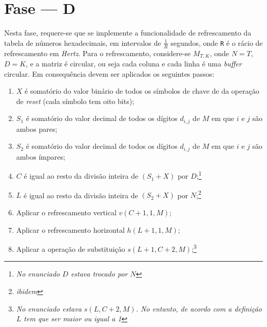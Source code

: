 \section{Fase --- D}

Nesta fase, requere-se que se implemente a funcionalidade de refrescamento da
tabela de números hexadecimais, em intervalos de $\frac{1}{R}$ segundos, onde
\texttt{R} é o rácio de refrescamento em \emph{Hertz}.  Para o refrescamento,
considere-se $M_{T,K}$, onde $N=T$, $D=K$, e a matriz é circular, ou seja cada
coluna e cada linha é uma \emph{buffer} circular. Em consequência devem ser
aplicados os seguintes passos:

\begin{enumerate}
	\item $X$ é somatório do valor binário de todos os símbolos de chave de
		da operação de \emph{reset} (cada símbolo tem oito bits);

	\item$S_1$ é somatório do valor decimal de todos os dígitos $d_{i,j}$ de $M$ em
		que $i$ e $j$ são ambos pares;

	\item$S_2$ é somatório do valor decimal de todos os dígitos $d_{i,j}$ de $M$
		em que $i$ e $j$ são ambos ímpares;

	\item$C$ é igual ao resto da divisão inteira de $(S_1 + X)$ por
		$D$;\footnote{\emph{No enunciado $D$ estava trocado por $N$}}
                                                               
	\item$L$ é igual ao resto da divisão inteira de $(S_2 + X)$ por
		$N$;\footnote{\emph{ibidem}}

	\item Aplicar o refrescamento vertical   $v(C+1,1,M)$;

	\item Aplicar o refrescamento horizontal $h(L+1,1,M)$;

	\item Aplicar a operação de substituição $s(L+1,C+2,M)$;\footnote{\emph{No
		enunciado estava $s(L,C+2,M)$. No entanto, de acordo com a definição $L$ tem
	que ser maior ou igual a 1}}
\end{enumerate}


